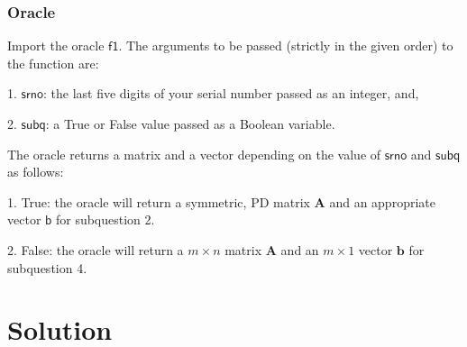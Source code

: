\documentclass[12pt,a4paper]{article}
\theoremstyle{remark}
\begin{document}
\subsubsection*{Oracle}

Import the oracle $\mathsf{f1}$. The arguments to be passed (strictly in the given order) to the function are:

1. $\mathsf{srno}$: the last five digits of your serial number passed as an integer, and,

2. $\mathsf{subq}$: a True or False value passed as a Boolean variable.

The oracle returns a matrix and a vector depending on the value of $\mathsf{srno}$ and $\mathsf{subq}$ as follows:

1. True: the oracle will return a symmetric, PD matrix $\mathbf{A}$ and an appropriate vector $\mathsf{b}$ for subquestion 2.

2. False: the oracle will return a $m \times n$ matrix $\mathbf{A}$ and an $m \times 1$ vector $\mathbf{b}$ for subquestion 4.


\section*{Solution}
\end{document}
